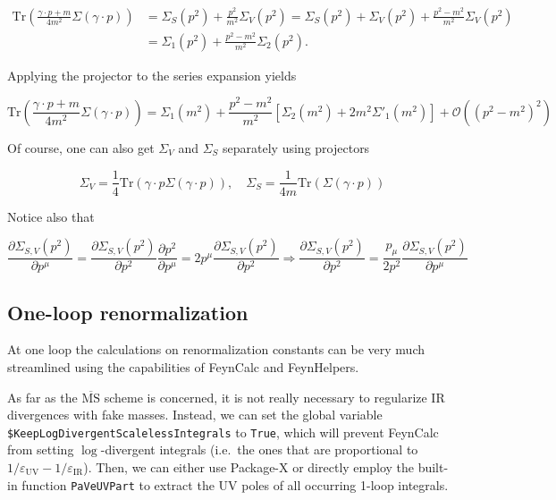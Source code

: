 \documentclass[../FeynCalcManual.tex]{subfiles}
\begin{document}
\begin{align*}
\mathrm{Tr} \left( \frac{\gamma \cdot p+m}{4m^2} \Sigma (\gamma \cdot p) \right ) & = \Sigma_S (p^2) + \frac{p^2}{m^2} \Sigma_V(p^2) = \Sigma_S (p^2) + \Sigma_V(p^2) + \frac{p^2-m^2}{m^2} \Sigma_V(p^2) \\
    &  = \Sigma_1 (p^2) + \frac{p^2-m^2}{m^2} \Sigma_2(p^2).
\end{align*}

Applying the projector to the series expansion yields

\begin{equation}
    \mathrm{Tr} \left( \frac{\gamma \cdot p+m}{4m^2} \Sigma (\gamma \cdot p) \right )  = \Sigma_1(m^2) +
    \frac{p^2-m^2}{m^2}  \left [ \Sigma_2(m^2) + 2 m^2 \Sigma'_1 (m^2)  \right ] + \mathcal{O}((p^2 -m^2)^2)
\end{equation}

Of course, one can also get \(\Sigma_V\) and \(\Sigma_S\) separately
using projectors

\begin{equation}
\Sigma_V = \frac{1}{4} \mathrm{Tr}(\gamma \cdot p \Sigma (\gamma \cdot p)), \quad \Sigma_S = \frac{1}{4 m} \mathrm{Tr}(\Sigma (\gamma \cdot p))
\end{equation}

Notice also that

\begin{equation}
 \frac{\partial \Sigma_{S,V}(p^2)}{\partial p^\mu} = \frac{\partial \Sigma_{S,V}(p^2)}{\partial p^2} \frac{\partial p^2}{\partial p^\mu} = 2 p^\mu \frac{\partial \Sigma_{S,V}(p^2)}{\partial p^2} \Rightarrow 
  \frac{\partial \Sigma_{S,V}(p^2)}{\partial p^2} = \frac{p_\mu}{2 p^2 } \frac{\partial \Sigma_{S,V}(p^2)}{\partial p^\mu}
\end{equation}

\hypertarget{one-loop-renormalization}{%
\subsection{One-loop renormalization}\label{one-loop-renormalization}}

At one loop the calculations on renormalization constants can be very
much streamlined using the capabilities of FeynCalc and FeynHelpers.

As far as the \(\overline{\textrm{MS}}\) scheme is concerned, it is not
really necessary to regularize IR divergences with fake masses. Instead,
we can set the global variable
\texttt{\$KeepLogDivergentScalelessIntegrals} to \texttt{True}, which
will prevent FeynCalc from setting \(\log\)-divergent integrals
(i.e.~the ones that are proportional to
\(1/\varepsilon_{\textrm{UV}} - 1/\varepsilon_{\textrm{IR}}\)). Then, we
can either use Package-X or directly employ the built-in function
\texttt{PaVeUVPart} to extract the UV poles of all occurring 1-loop
integrals.
\end{document}
